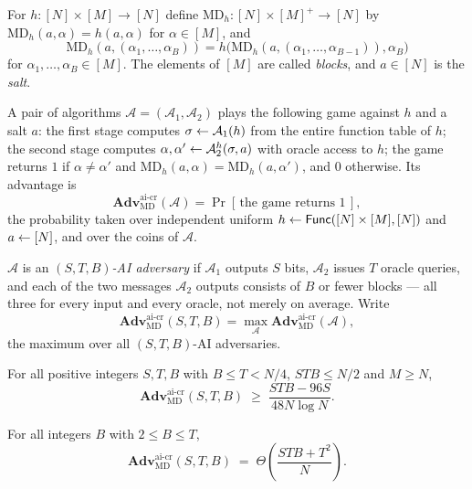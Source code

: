 \documentclass{aicr-conjecture}
\newcommand{\MD}{\mathrm{MD}}
\newcommand{\Adv}{\mathbf{Adv}}
\newcommand{\aicr}{\mathrm{ai\text{-}cr}}
\newcommand{\Func}{\mathsf{Func}}
\begin{document}
\begin{definition}\label{def:md}
For $h : [N] \times [M] \to [N]$ define
$\MD_{h} : [N] \times [M]^{+} \to [N]$ by $\MD_{h}(a, \alpha) =
h(a, \alpha)$ for $\alpha \in [M]$, and
\[
  \MD_{h}(a, (\alpha_{1}, \dots, \alpha_{B}))
  = h\bigl(\MD_{h}(a, (\alpha_{1}, \dots, \alpha_{B-1})),
           \alpha_{B}\bigr)
\]
for $\alpha_{1}, \dots, \alpha_{B} \in [M]$. The elements of $[M]$ are
called \emph{blocks}, and $a \in [N]$ is the \emph{salt}.
\end{definition}

\begin{definition}\label{def:aicr}
A pair of algorithms $\mathcal{A} = (\mathcal{A}_{1}, \mathcal{A}_{2})$
plays the following game against $h$ and a salt $a$: the first stage
computes $\sigma \leftarrow \mathcal{A}_{1}(h)$ from the entire function
table of $h$; the second stage computes $\alpha, \alpha' \leftarrow
\mathcal{A}_{2}^{h}(\sigma, a)$ with oracle access to $h$; the game
returns $1$ if $\alpha \ne \alpha'$ and $\MD_{h}(a, \alpha) =
\MD_{h}(a, \alpha')$, and $0$ otherwise. Its advantage is
\[
  \Adv^{\aicr}_{\MD}(\mathcal{A})
  = \Pr[\,\text{the game returns } 1\,],
\]
the probability taken over independent uniform $h \sample \Func([N]
\times [M], [N])$ and $a \leftarrow [N]$, and over the coins of
$\mathcal{A}$.

$\mathcal{A}$ is an \emph{$(S,T,B)$-AI adversary} if $\mathcal{A}_{1}$
outputs $S$ bits, $\mathcal{A}_{2}$ issues $T$ oracle queries, and each
of the two messages $\mathcal{A}_{2}$ outputs consists of $B$ or fewer
blocks --- all three for every input and every oracle, not merely on
average. Write
\[
  \Adv^{\aicr}_{\MD}(S,T,B)
  = \max_{\mathcal{A}} \Adv^{\aicr}_{\MD}(\mathcal{A}),
\]
the maximum over all $(S,T,B)$-AI adversaries.
\end{definition}

\begin{theorem}\label{thm:attack}
For all positive integers $S, T, B$ with $B \le T < N/4$, $STB \le
N/2$ and $M \ge N$,
\[
  \Adv^{\aicr}_{\MD}(S,T,B) \;\ge\; \frac{STB - 96S}{48 N \log N}.
\]
\end{theorem}

\begin{conjecture}[STB]\label{conj:stb}
For all integers $B$ with $2 \le B \le T$,
\[
  \Adv^{\aicr}_{\MD}(S,T,B)
  \;=\; \Theta\!\left(\frac{STB + T^{2}}{N}\right).
\]
\end{conjecture}
\end{document}
